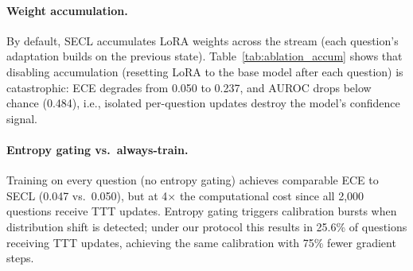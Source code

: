 \paragraph{Weight accumulation.}
By default, SECL accumulates LoRA weights across the stream
(each question's adaptation builds on the previous state).
Table~\ref{tab:ablation_accum} shows that disabling accumulation
(resetting LoRA to the base model after each question)
is catastrophic: ECE degrades from 0.050 to 0.237, and AUROC
drops below chance (0.484), i.e., isolated per-question updates destroy the model's confidence
signal.

\begin{table}[htbp]
\centering
\small
{}%
\caption{Weight accumulation ablation (Llama~3.2-3B).}
\label{tab:ablation_accum}
\end{table}

\paragraph{Entropy gating vs.\ always-train.}
Training on every question (no entropy gating) achieves comparable ECE
to SECL (0.047 vs.\ 0.050), but at 4$\times$ the computational cost
since all 2{,}000 questions receive TTT updates.
Entropy gating triggers calibration bursts when distribution shift is detected;
under our protocol this results in 25.6\% of questions receiving TTT updates,
achieving the same calibration with 75\% fewer gradient steps.

\begin{table}[htbp]
\centering
\small
{}%
\caption{Entropy gating vs.\ always-train (Llama~3.2-3B).
Entropy gating matches always-train ECE at a fraction of the cost.}
\label{tab:ablation_phgate}
\end{table}

